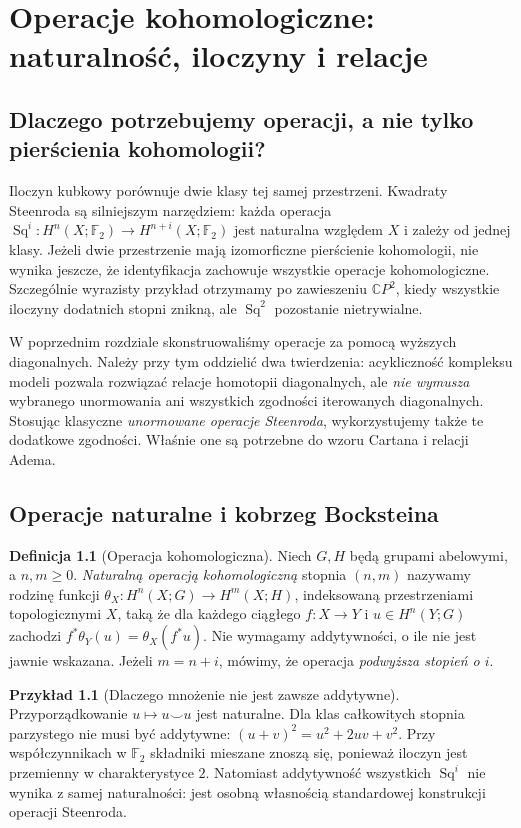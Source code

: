 \documentclass[11pt,a4paper,oneside]{report}
\newcommand{\F}{\mathbb{F}}
\newcommand{\C}{\mathbb{C}}
\theoremstyle{plain}
\theoremstyle{definition}
\newtheorem{definicja}[twierdzenie]{Definicja}
\newtheorem{przyklad}[twierdzenie]{Przykład}
\theoremstyle{remark}
\begin{document}
\chapter{Operacje kohomologiczne: naturalność, iloczyny i relacje}
\label{ch:operacje-v8}

\section{Dlaczego potrzebujemy operacji, a nie tylko pierścienia kohomologii?}
Iloczyn kubkowy porównuje dwie klasy tej samej przestrzeni. Kwadraty
Steenroda są silniejszym narzędziem: każda operacja
$\operatorname{Sq}^i:H^n(X;\F_2)\to H^{n+i}(X;\F_2)$
jest naturalna względem $X$ i zależy od jednej klasy.
Jeżeli dwie przestrzenie mają izomorficzne pierścienie kohomologii,
nie wynika jeszcze, że identyfikacja zachowuje wszystkie operacje
kohomologiczne. Szczególnie wyrazisty przykład otrzymamy po zawieszeniu
$\C P^2$, kiedy wszystkie iloczyny dodatnich stopni znikną, ale
$\operatorname{Sq}^2$ pozostanie nietrywialne.

W poprzednim rozdziale skonstruowaliśmy operacje za pomocą wyższych
diagonalnych. Należy przy tym oddzielić dwa twierdzenia:
acykliczność kompleksu modeli pozwala rozwiązać relacje homotopii
diagonalnych, ale \emph{nie wymusza} wybranego unormowania ani
wszystkich zgodności iterowanych diagonalnych. Stosując klasyczne
\emph{unormowane operacje Steenroda}, wykorzystujemy także te dodatkowe
zgodności. Właśnie one są potrzebne do wzoru Cartana i relacji Adema.

\section{Operacje naturalne i kobrzeg Bocksteina}
\begin{definicja}[Operacja kohomologiczna]
Niech $G,H$ będą grupami abelowymi, a $n,m\ge0$.
\emph{Naturalną operacją kohomologiczną} stopnia $(n,m)$ nazywamy
rodzinę funkcji
$\theta_X:H^n(X;G)\to H^m(X;H)$, indeksowaną
przestrzeniami topologicznymi $X$, taką że dla każdego ciągłego
$f:X\to Y$ i $u\in H^n(Y;G)$ zachodzi
$f^*\theta_Y(u)=\theta_X(f^*u)$.
Nie wymagamy addytywności, o ile nie jest jawnie wskazana.
Jeżeli $m=n+i$, mówimy, że operacja \emph{podwyższa stopień o $i$}.
\end{definicja}

\begin{przyklad}[Dlaczego mnożenie nie jest zawsze addytywne]
Przyporządkowanie $u\mapsto u\smile u$ jest naturalne. Dla klas
całkowitych stopnia parzystego nie musi być addytywne:
$(u+v)^2=u^2+2uv+v^2$. Przy współczynnikach w $\F_2$ składniki mieszane
znoszą się, ponieważ iloczyn jest przemienny w charakterystyce $2$.
Natomiast addytywność wszystkich $\operatorname{Sq}^i$
nie wynika z samej naturalności: jest osobną własnością
standardowej konstrukcji operacji Steenroda.
\end{przyklad}
\end{document}
